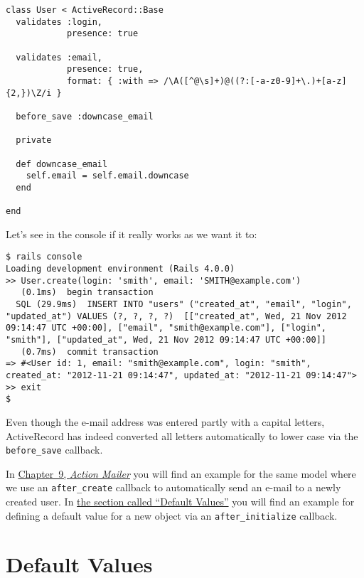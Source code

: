 \documentclass[a4paper]{book}
\begin{document}
\begin{shaded}\begin{verbatim}
class User < ActiveRecord::Base
  validates :login,
            presence: true

  validates :email,
            presence: true,
            format: { :with => /\A([^@\s]+)@((?:[-a-z0-9]+\.)+[a-z]{2,})\Z/i }

  before_save :downcase_email

  private

  def downcase_email
    self.email = self.email.downcase
  end

end
\end{verbatim}\end{shaded}

Let's see in the console if it really works as we want it to:

\begin{shaded}\begin{verbatim}
$ rails console
Loading development environment (Rails 4.0.0)
>> User.create(login: 'smith', email: 'SMITH@example.com')
   (0.1ms)  begin transaction
  SQL (29.9ms)  INSERT INTO "users" ("created_at", "email", "login", "updated_at") VALUES (?, ?, ?, ?)  [["created_at", Wed, 21 Nov 2012 09:14:47 UTC +00:00], ["email", "smith@example.com"], ["login", "smith"], ["updated_at", Wed, 21 Nov 2012 09:14:47 UTC +00:00]]
   (0.7ms)  commit transaction
=> #<User id: 1, email: "smith@example.com", login: "smith", created_at: "2012-11-21 09:14:47", updated_at: "2012-11-21 09:14:47">
>> exit
$
\end{verbatim}\end{shaded}

Even though the e-mail address was entered partly with a capital letters, ActiveRecord has indeed converted all letters automatically to lower case via the \texttt{before\_save} callback.

In \hyperref[actionux5fmailer]{Chapter~9, \emph{Action Mailer}} you will find an example for the same model where we use an \texttt{after\_create} callback to automatically send an e-mail to a newly created user. In \hyperref[arux5fdefaultux5fwerte]{the section called “Default Values”} you will find an example for defining a default value for a new object via an \texttt{after\_initialize} callback.

\section{Default Values}\label{default-values}
\end{document}
